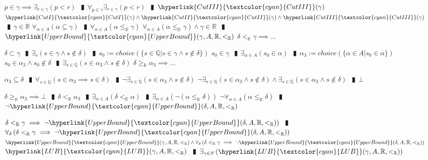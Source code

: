 \documentclass{book}
\newcommand{\rf}[1]{\hyperlink{#1}{\textcolor{cyan}{#1}}}
\newcommand{\abr}{:=}
\newcommand{\pipe}{$\phantom{(}\vrectangleblack\phantom{)}$}
\newcommand{\pr}[1]{\left(#1\right)}
\begin{document}
\begin{enumerate}
\begin{enumerate}
\begin{enumerate}
    \end{enumerate}
    \lit $p \in \gamma \implies \exists_{r \in \gamma}(p < r)$ \pipe $\forall_{p \in \gamma} \exists_{r \in \gamma}(p < r)$ \pipe $\rf{CutIII}(\gamma)$
    \lit $\rf{CutI}(\gamma) \land \rf{CutII}(\gamma) \land \rf{CutIII}(\gamma)$ \pipe $\gamma \in \mathbb{R}$
    \lit $\forall_{\alpha \in A}(\alpha \subseteq \gamma)$ \pipe $\forall_{\alpha \in A}(\alpha \leq_{\mathbb{R}} \gamma)$
    \lit $\forall_{\alpha \in A}(\alpha \leq_{\mathbb{R}} \gamma) \land \gamma \in \mathbb{R}$ \pipe $\rf{UpperBound}(\gamma, A, \mathbb{R}, <_{\mathbb{R}})$
    \lit $\delta <_{\mathbb{R}} \gamma \implies \ldots$
    \begin{enumerate}
      \lit $\delta \subset \gamma$ \pipe $\exists_{s}(s \in \gamma \land s \notin \delta)$ \pipe $s_0 \abr choice(\{s \in \mathbb{Q} | s \in \gamma \land s \notin \delta\})$
      \lit $s_0 \in \gamma$ \pipe $\exists_{\alpha \in A}(s_0 \in \alpha)$ \pipe $\alpha_3 \abr choice(\{\alpha \in A | s_0 \in \alpha\})$
      \lit $s_0 \in \alpha_3 \land s_0 \notin \delta$ \pipe $\exists_{s \in \mathbb{Q}}(s \in \alpha_3 \land s \notin \delta)$
      \lit $\delta \geq_{\mathbb{R}} \alpha_3 \implies \ldots$
      \begin{enumerate}
        \lit $\alpha_3 \subseteq \delta$ \pipe $\forall_{s \in \mathbb{Q}}(s \in \alpha_3 \implies s \in \delta)$ \pipe $\lnot \exists_{s \in \mathbb{Q}}(s \in \alpha_3 \land s \notin \delta)$
        \lit $\lnot \exists_{s \in \mathbb{Q}}(s \in \alpha_3 \land s \notin \delta) \land \exists_{s \in \mathbb{Q}}(s \in \alpha_3 \land s \notin \delta)$ \pipe $\bot$
      \end{enumerate}
      \lit $\delta \geq_{\mathbb{R}} \alpha_3 \implies \bot$ \pipe $\delta <_{\mathbb{R}} \alpha_3$ \pipe $\exists_{\alpha \in A}(\delta <_{\mathbb{R}} \alpha)$ \pipe $\exists_{\alpha \in A}\pr{\lnot(\alpha \leq_{\mathbb{R}} \delta)}$
      \lit $\lnot \forall_{\alpha \in A}(\alpha \leq_{\mathbb{R}} \delta)$ \pipe $\lnot \rf{UpperBound}(\delta, A, \mathbb{R}, <_{\mathbb{R}})$
    \end{enumerate}
    \lit $\delta <_{\mathbb{R}} \gamma \implies \lnot \rf{UpperBound}(\delta, A, \mathbb{R}, <_{\mathbb{R}}))$ \pipe $\forall_{\delta}\pr{\delta <_{\mathbb{R}} \gamma \implies \lnot \rf{UpperBound}(\delta, A, \mathbb{R}, <_{\mathbb{R}})}$
    \lit $\rf{UpperBound}(\gamma, A, \mathbb{R}, <_{\mathbb{R}}) \land \forall_{\delta}\pr{\delta <_{\mathbb{R}} \gamma \implies \lnot \rf{UpperBound}(\delta, A, \mathbb{R}, <_{\mathbb{R}})}$
    \lit $\rf{LUB}(\gamma, A, \mathbb{R}, <_{\mathbb{R}})$ \pipe $\exists_{\gamma \in S}\pr{\rf{LUB}(\gamma, A, \mathbb{R}, <_{\mathbb{R}})}$

\end{enumerate}
\end{enumerate}
\end{document}

